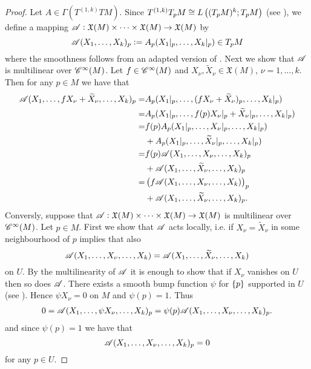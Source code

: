 \begin{appendix}
\begin{proof}
Let $A \in \Gamma(T^{(1,k)}TM)$. Since $T^{(1,k)}T_pM \cong L\del[1]{(T_pM)^k;T_pM}$ (see \cite[23]{kobayashi:diff_geo_I:1996}), we define a mapping $\mathscr{A}: \mathfrak{X}(M) \times \dots \times \mathfrak{X}(M) \to \mathfrak{X}(M)$ by
\begin{equation*}
\mathscr{A}(X_1,\dots,X_k)_p := A_p(X_1\vert_p,\dots,X_k\vert_p) \in T_pM
\end{equation*}
\noindent where the smoothness follows from an adapted version of \cite[317--318]{lee:smooth_manifolds:2013}. Next we show that $\mathscr{A}$ is multilinear over $\mathscr{C}^\infty(M)$. Let $f \in \mathscr{C}^\infty(M)$ and $X_\nu,\widetilde{X}_\nu \in \mathfrak{X}(M)$, $\nu = 1,\dots,k$. Then for any $p \in M$ we have that
\begin{align*}
\Ascr(X_1,\dots,fX_\nu + \widetilde{X}_\nu,\dots,X_k)_p =& A_p(X_1\vert_p,\dots,(fX_\nu + \widetilde{X}_\nu)_p,\dots,X_k\vert_p)\\
=& A_p(X_1\vert_p,\dots,f(p)X_\nu\vert_p + \widetilde{X}_\nu\vert_p,\dots,X_k\vert_p)\\
=& f(p)A_p(X_1\vert_p,\dots,X_\nu\vert_p ,\dots,X_k\vert_p)\\
& + A_p(X_1\vert_p,\dots,\widetilde{X}_\nu\vert_p,\dots,X_k\vert_p)\\
=& f(p) \Ascr(X_1,\dots,X_\nu,\dots,X_k)_p\\
& + \Ascr(X_1,\dots,\widetilde{X}_\nu,\dots,X_k)_p\\
=& \del[1]{f \Ascr(X_1,\dots,X_\nu,\dots,X_k)}_p \\
& + \Ascr(X_1,\dots,\widetilde{X}_\nu,\dots,X_k)_p.
\end{align*}
Conversly, suppose that $\mathscr{A}: \mathfrak{X}(M) \times \dots \times \mathfrak{X}(M) \to \mathfrak{X}(M)$ is multilinear over $\mathscr{C}^\infty(M)$. Let $p \in M$. First we show that $\mathscr{A}$ acts locally, i.e. if $X_\nu = \widetilde{X}_\nu$ in some neighbourhood of $p$ implies that also 
\begin{equation*}
\mathscr{A}(X_1,\dots,X_\nu,\dots,X_k) = \mathscr{A}(X_1,\dots,\widetilde{X}_\nu,\dots,X_k)
\end{equation*}
\noindent on $U$. By the multilinearity of $\mathscr{A}$ it is enough to show that if $X_\nu$ vanishes on $U$ then so does $\mathscr{A}$. There exists a smooth bump function $\psi$ for $\cbr[0]{p}$ supported in $U$ (see \cite[44]{lee:smooth_manifolds:2013}). Hence $\psi X_\nu = 0$ on $M$ and $\psi(p) = 1$. Thus
\begin{align*}
0 = \mathscr{A}(X_1,\dots,\psi X_\nu,\dots,X_k)_p = \psi(p)\mathscr{A}(X_1,\dots,X_\nu,\dots,X_k)_p.
\end{align*}
\noindent and since $\psi(p) = 1$ we have that
\begin{equation*}
\mathscr{A}(X_1,\dots,X_\nu,\dots,X_k)_p = 0
\end{equation*}
\noindent for any $p \in U$.
\end{proof}

\end{appendix}

\printbibliography


